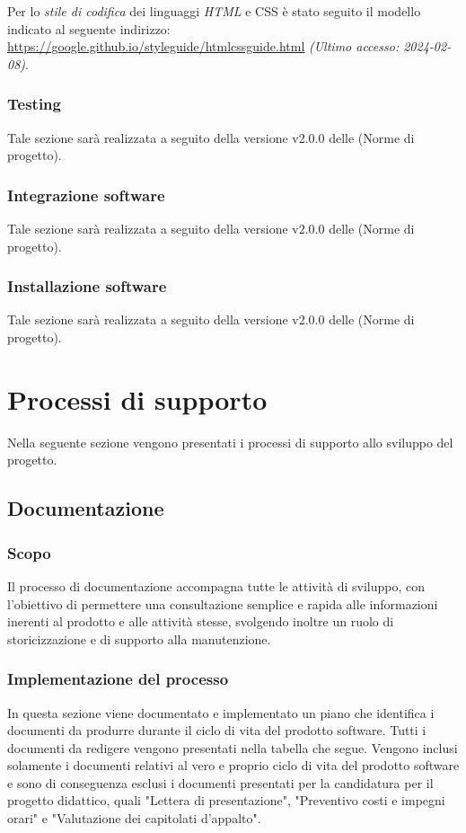 \documentclass[10pt, a4paper]{article}
\begin{document}
Per lo \textit{stile di codifica\pg} dei linguaggi \textit{HTML\pg} e CSS è stato seguito il modello indicato al seguente
indirizzo: \url{https://google.github.io/styleguide/htmlcssguide.html} \textit{(Ultimo accesso: 2024-02-08)}.

\subsubsection{Testing}
Tale sezione sarà realizzata a seguito della versione v2.0.0 delle (Norme di progetto).

\subsubsection{Integrazione software}
Tale sezione sarà realizzata a seguito della versione v2.0.0 delle (Norme di progetto).

\subsubsection{Installazione software}
Tale sezione sarà realizzata a seguito della versione v2.0.0 delle (Norme di progetto).

\newpage

\section{Processi di supporto}
Nella seguente sezione vengono presentati i processi di supporto allo sviluppo del progetto.

\subsection{Documentazione}
\label{sec:documents}
\subsubsection{Scopo}
Il processo di documentazione accompagna tutte le attività di sviluppo, con l'obiettivo di permettere una consultazione semplice e 
rapida alle informazioni inerenti al prodotto e alle attività stesse, svolgendo inoltre un ruolo di storicizzazione e di supporto alla 
manutenzione.

\subsubsection{Implementazione del processo}
In questa sezione viene documentato e implementato un piano che identifica i documenti da produrre durante il ciclo di vita del prodotto 
software. Tutti i documenti da redigere vengono presentati nella tabella che segue. Vengono inclusi solamente i documenti relativi al vero e
 proprio ciclo di vita del prodotto software e sono di conseguenza esclusi i documenti presentati per la candidatura per il progetto 
 didattico, quali "Lettera di presentazione", "Preventivo costi e impegni orari" e "Valutazione dei capitolati d'appalto".
\end{document}
